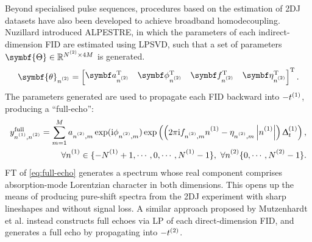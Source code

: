 Beyond specialised pulse sequences, procedures based on the estimation of
\ac{2DJ} datasets have also been developed to achieve broadband homodecoupling.
Nuzillard introduced \ac{ALPESTRE}\cite{Nuzillard1996,Martinez2012}, in which
the parameters of each indirect-dimension FID are estimated using \ac{LPSVD},
such that a set of parameters $\symbf{\Theta} \in \mathbb{R}^{\Ntwo
\times 4M}$ is generated.
\begin{equation}
    \symbf{\theta}_{\ntwo} =
    \begin{bmatrix}
        \bda_{\ntwo}\T &
        \bdphi_{\ntwo}\T &
        \bdf_{\ntwo}\T &
        \bdeta_{\ntwo}\T
    \end{bmatrix}\T.
\end{equation}
The parameters generated are used to propagate each FID backward into
$-t^{(1)}$, producing a ``full-echo'':
\begin{equation}
    \begin{split}
        y^{\text{full}}_{\none,\ntwo} = \sum_{m=1}^{M}
            a_{\ntwo,m}
            \exp(\iu \phi_{\ntwo,m})
            \exp\left(\left(2 \pi \iu f_{\ntwo,m} \none
            -\eta_{\ntwo,m}  \left\lvert \none \right\rvert \right)\Dtone\right), \\
        \forall \none \in \lbrace -\None + 1, \cdots, 0, \cdots, \None - 1 \rbrace,\ \forall \ntwo \lbrace 0, \cdots, \Ntwo - 1 \rbrace.
    \end{split}
    \label{eq:full-echo}
\end{equation}
\ac{FT} of \eqref{eq:full-echo} generates a spectrum whose real component comprises absorption-mode
Lorentzian character in both dimensions. This opens up the means of producing
pure-shift spectra from the \ac{2DJ} experiment with sharp lineshapes and
without signal loss. A similar approach proposed by Mutzenhardt et al.
instead constructs full echoes via \ac{LP} of each direct-dimension
\ac{FID}, and generates a full echo by propagating into
$-t^{(2)}$\cite{Mutzenhardt1999}.


